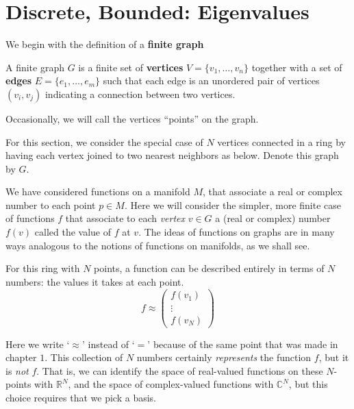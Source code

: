 \documentclass[../master.tex]{subfiles}
\begin{document}
\section{Discrete, Bounded: Eigenvalues}

	We begin with the definition of a \textbf{finite graph}
	\begin{defn}
		A finite graph $G$ is a finite set of \textbf{vertices} $V = \{v_1, \dots, v_n\}$ together with a set of \textbf{edges} $E = \{e_1, \dots, e_m\}$ such that each edge is an unordered pair of vertices $(v_i, v_j)$ indicating a connection between two vertices. 
	\end{defn}
	
	Occasionally, we will call the vertices ``points'' on the graph.	
	
	For this section, we consider the special case of $N$ vertices connected in a ring by having each vertex joined to two nearest neighbors as below. Denote this graph by $G$.

	
	We have considered functions on a manifold $M$, that associate a real or complex number to each point $p \in M$. Here we will consider the simpler, more finite case of functions $f$ that associate to each \emph{vertex} $v \in G$ a (real or complex) number $f(v)$ called the value of $f$ at $v$. The ideas of functions on graphs are in many ways analogous to the notions of functions on manifolds, as we shall see.
	
	For this ring with $N$ points, a function can be described entirely in terms of $N$ numbers: the values it takes at each point. 
	\begin{equation*}
		f \approx \begin{pmatrix}
			f(v_1) \\
			\vdots \\
			f(v_N)
		\end{pmatrix}
	\end{equation*}
	
	Here we write `$\approx$' instead of `$=$' because of the same point that was made in chapter $1$. This collection of $N$ numbers certainly \emph{represents} the function $f$, but it is \emph{not} $f$. That is, we can identify the space of real-valued functions on these $N$-points with $\mathbb{R}^N$, and the space of complex-valued functions with $\mathbb C^N$, but this choice requires that we pick a basis. 
	
\end{document}
